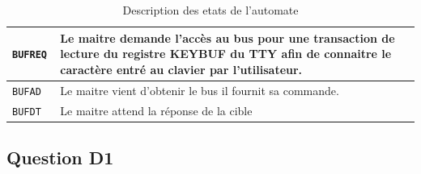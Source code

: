\documentclass{article}
\begin{document}
\begin{table}[H]
\begin{tabular}{ | l | p{15cm} | }
\tt{BUFREQ}  &
Le maitre demande l'accès au bus pour une transaction de lecture du registre
KEYBUF du TTY afin de connaitre le caractère entré au clavier par l'utilisateur. \\
\hline

\tt{BUFAD}   &
Le maitre vient d'obtenir le bus il fournit sa commande. \\
\hline

\tt{BUFDT}   &
Le maitre attend la réponse de la cible \\
\hline

\end{tabular}
\endgroup
\caption{Description des etats de l'automate}
\end{table}


\subsection{Question D1}
\end{document}
